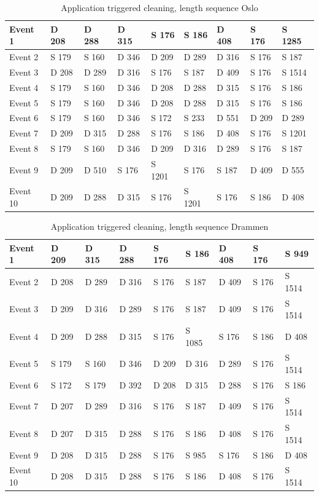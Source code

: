 \begin{table}[H]
\centering
\caption{Application triggered cleaning, length sequence Oslo}
\label{tab:ACSequenceOslo}
\begin{tabular}{|l|l|l|l|l|l|l|l|l|}
\hline
Event 1  & D 208 & D 288 & D 315 & S 176  & S 186  & D 408 & S 176 & S 1285 \\ \hline
Event 2  & S 179 & S 160 & D 346 & D 209  & D 289  & D 316 & S 176 & S 187  \\ \hline
Event 3  & D 208 & D 289 & D 316 & S 176  & S 187  & D 409 & S 176 & S 1514 \\ \hline
Event 4  & S 179 & S 160 & D 346 & D 208  & D 288  & D 315 & S 176 & S 186  \\ \hline
Event 5  & S 179 & S 160 & D 346 & D 208  & D 288  & D 315 & S 176 & S 186  \\ \hline
Event 6  & S 179 & S 160 & D 346 & S 172  & S 233  & D 551 & D 209 & D 289  \\ \hline
Event 7  & D 209 & D 315 & D 288 & S 176  & S 186  & D 408 & S 176 & S 1201 \\ \hline
Event 8  & S 179 & S 160 & D 346 & D 209  & D 316  & D 289 & S 176 & S 187  \\ \hline
Event 9  & D 209 & D 510 & S 176 & S 1201 & S 176  & S 187 & D 409 & D 555  \\ \hline
Event 10 & D 209 & D 288 & D 315 & S 176  & S 1201 & S 176 & S 186 & D 408  \\ \hline
\end{tabular}
\end{table}

\begin{table}[H]
\centering
\caption{Application triggered cleaning, length sequence Drammen}
\label{tab:ACSequenceDrammen}
\begin{tabular}{|l|l|l|l|l|l|l|l|l|}
\hline
Event 1  & D 209 & D 315 & D 288 & S 176 & S 186  & D 408 & S 176 & S 949  \\ \hline
Event 2  & D 208 & D 289 & D 316 & S 176 & S 187  & D 409 & S 176 & S 1514 \\ \hline
Event 3  & D 209 & D 316 & D 289 & S 176 & S 187  & D 409 & S 176 & S 1514 \\ \hline
Event 4  & D 209 & D 288 & D 315 & S 176 & S 1085 & S 176 & S 186 & D 408  \\ \hline
Event 5  & S 179 & S 160 & D 346 & D 209 & D 316  & D 289 & S 176 & S 1514 \\ \hline
Event 6  & S 172 & S 179 & D 392 & D 208 & D 315  & D 288 & S 176 & S 186  \\ \hline
Event 7  & D 207 & D 289 & D 316 & S 176 & S 187  & D 409 & S 176 & S 1514 \\ \hline
Event 8  & D 207 & D 315 & D 288 & S 176 & S 186  & D 408 & S 176 & S 1514 \\ \hline
Event 9  & D 208 & D 315 & D 288 & S 176 & S 985  & S 176 & S 186 & D 408  \\ \hline
Event 10 & D 208 & D 315 & D 288 & S 176 & S 186  & D 408 & S 176 & S 1514 \\ \hline
\end{tabular}
\end{table}

